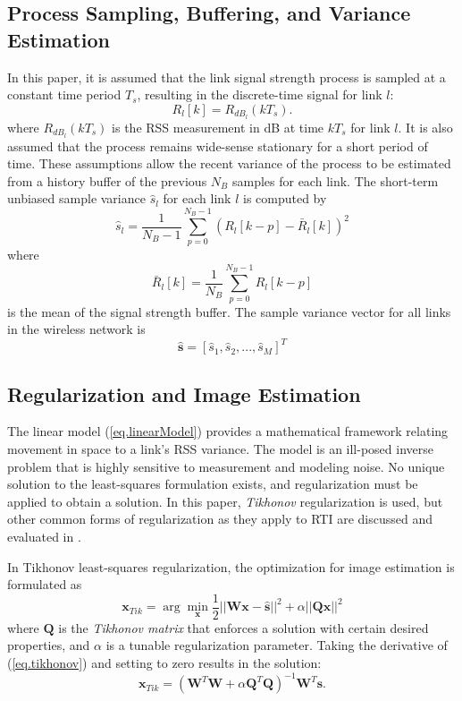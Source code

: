 \documentclass[journal]{IEEEtran}
\begin{document}
\subsection{Process Sampling, Buffering, and Variance Estimation}\label{section.VRTI.processSampling}
In this paper, it is assumed that the link signal strength process is sampled at a constant time period $T_s$, resulting in the discrete-time signal for link $l$:
\begin{equation}
R_l[k] = R_{dB_l}(kT_s).
\end{equation} 
where $R_{dB_l}(kT_s)$ is the RSS measurement in dB at time $kT_s$ for link $l$. It is also assumed that the process remains wide-sense stationary for a short period of time. These assumptions allow the recent variance of the process to be estimated from a history buffer of the previous $N_B$ samples for each link. The short-term unbiased sample variance $\hat{s}_l$ for each link $l$ is computed by
\begin{equation}
\hat{s}_l = \frac{1}{N_B-1} \sum_{p=0}^{N_B-1} (R_l[k-p] - \bar{R}_l[k])^2
\end{equation} 
where
\begin{equation}
\bar{R}_l[k] = \frac{1}{N_B} \sum_{p=0}^{N_B-1} R_l[k-p]
\end{equation}
is the mean of the signal strength buffer. The sample variance vector for all links in the wireless network is
\begin{equation}
\hat{\textbf{s}} = \left[ \hat{s}_1, \hat{s}_2, ... , \hat{s}_M \right] ^T
\end{equation} 

\subsection{Regularization and Image Estimation}
The linear model (\ref{eq.linearModel}) provides a mathematical framework relating movement in space to a link's RSS variance. The model is an ill-posed inverse problem that is highly sensitive to measurement and modeling noise. No unique solution to the least-squares formulation exists, and regularization must be applied to obtain a solution. In this paper, \textit{Tikhonov} regularization is used, but other common forms of regularization as they apply to RTI are discussed and evaluated in \cite{Wilson09b}.

In Tikhonov least-squares regularization, the optimization for image estimation is formulated as
\begin{equation}
\textbf{x}_{Tik} = \arg \min_\textbf{x} \frac{1}{2}||\textbf{Wx} - \hat{\textbf{s}}||^2 + \alpha || \textbf{Qx} ||^2
\label{eq.tikhonov}
\end{equation} 
where $\textbf{Q}$ is the \textit{Tikhonov matrix} that enforces a solution with certain desired properties, and $\alpha$ is a tunable regularization parameter. Taking the derivative of (\ref{eq.tikhonov}) and setting to zero results in the solution:
\begin{equation}
\textbf{x}_{Tik} = (\textbf{W}^T \textbf{W} + \alpha \textbf{Q}^T \textbf{Q})^{-1} \textbf{W}^T \textbf{s}.
\end{equation} 
\end{document}
